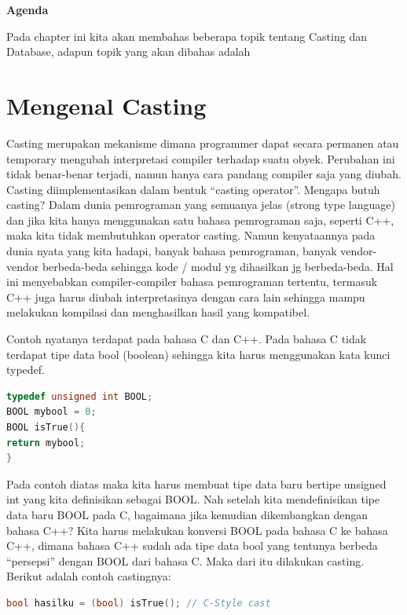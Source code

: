 \textbf{Agenda}

Pada chapter ini kita akan membahas beberapa topik tentang 
Casting dan Database, adapun topik yang akan dibahas
adalah

\minitoc

\section{Mengenal Casting}\label{mengenal-casting}

Casting merupakan mekanisme dimana programmer dapat secara permanen atau
temporary mengubah interpretasi compiler terhadap suatu obyek. Perubahan
ini tidak benar-benar terjadi, namun hanya cara pandang compiler saja
yang diubah. Casting diimplementasikan dalam bentuk ``casting
operator''. Mengapa butuh casting? Dalam dunia pemrograman yang semuanya
jelas (strong type language) dan jika kita hanya menggunakan satu bahasa
pemrograman saja, seperti C++, maka kita tidak membutuhkan operator
casting. Namun kenyataannya pada dunia nyata yang kita hadapi, banyak
bahasa pemrograman, banyak vendor-vendor berbeda-beda sehingga kode /
modul yg dihasilkan jg berbeda-beda. Hal ini menyebabkan
compiler-compiler bahasa pemrograman tertentu, termasuk C++ juga harus
diubah interpretasinya dengan cara lain sehingga mampu melakukan
kompilasi dan menghasilkan hasil yang kompatibel.

Contoh nyatanya terdapat pada bahasa C dan C++. Pada bahasa C tidak
terdapat tipe data bool (boolean) sehingga kita harus menggunakan kata
kunci typedef.

\begin{lstlisting}[language=c++, numbers=none]
typedef unsigned int BOOL;
BOOL mybool = 0;
BOOL isTrue(){
return mybool;
}
\end{lstlisting}

Pada contoh diatas maka kita harus membuat tipe data baru bertipe
unsigned int yang kita definisikan sebagai BOOL. Nah setelah kita
mendefinisikan tipe data baru BOOL pada C, bagaimana jika kemudian
dikembangkan dengan bahasa C++? Kita harus melakukan konversi BOOL pada
bahasa C ke bahasa C++, dimana bahasa C++ sudah ada tipe data bool yang
tentunya berbeda ``persepsi'' dengan BOOL dari bahasa C. Maka dari itu
dilakukan casting. Berikut adalah contoh castingnya:

\begin{lstlisting}[language=c++, numbers=none]
bool hasilku = (bool) isTrue(); // C-Style cast
\end{lstlisting}

